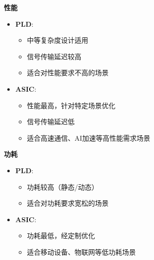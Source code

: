 \documentclass[
  ignorenonframetext,
  chinese,
]{beamer}
\providecommand{\tightlist}{%
  \setlength{\itemsep}{0pt}\setlength{\parskip}{0pt}}
\begin{document}
\begin{frame}
\textbf{性能}

\begin{itemize}
\tightlist
\item
  \textbf{PLD}:

  \begin{itemize}
  \tightlist
  \item
    中等复杂度设计适用\\
  \item
    信号传输延迟较高\\
  \item
    适合对性能要求不高的场景\\
  \end{itemize}
\item
  \textbf{ASIC}:

  \begin{itemize}
  \tightlist
  \item
    性能最高，针对特定场景优化\\
  \item
    信号传输延迟低\\
  \item
    适合高速通信、AI加速等高性能需求场景
  \end{itemize}
\end{itemize}
\end{frame}

\begin{frame}
\textbf{功耗}

\begin{itemize}
\tightlist
\item
  \textbf{PLD}:

  \begin{itemize}
  \tightlist
  \item
    功耗较高（静态/动态）\\
  \item
    适合对功耗要求宽松的场景\\
  \end{itemize}
\item
  \textbf{ASIC}:

  \begin{itemize}
  \tightlist
  \item
    功耗最低，经定制优化\\
  \item
    适合移动设备、物联网等低功耗场景
  \end{itemize}
\end{itemize}
\end{frame}
\end{document}
